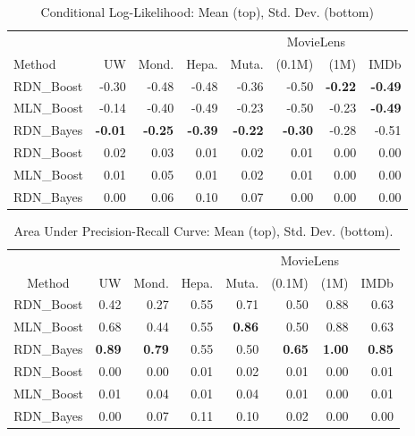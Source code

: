 \documentclass{sfuthesis}
\begin{document}
{\addtolength{\tabcolsep}{2pt}
\begin{table}[tb]
  \centering
  \caption{Conditional Log-Likelihood: Mean (top), Std. Dev. (bottom) }
    \begin{tabular}{l r r r r r r r}
    \hline
                 &          &              &                 &          & \multicolumn{2}{c}{MovieLens} & \\
                                                                                 \cline{6-7}
    Method & UW    & Mond. & Hepa. & Muta. & (0.1M) & (1M) & IMDb \\
    \hline
    RDN\_Boost & -0.30 & -0.48 & -0.48 & -0.36  & -0.50 & \textbf{-0.22} & \textbf{-0.49} \\
    MLN\_Boost & -0.14 & -0.40 & -0.49 & -0.23 & -0.50 & -0.23 & \textbf{-0.49} \\
    RDN\_Bayes & \textbf{-0.01} & \textbf{-0.25} & \textbf{-0.39} & \textbf{-0.22} & \textbf{-0.30} & -0.28 & -0.51 \\
    \hline
    RDN\_Boost & 0.02 & 0.03 & 0.01 & 0.02 & 0.01 & 0.00 & 0.00 \\
    MLN\_Boost & 0.01 & 0.05 & 0.01 & 0.02 & 0.01 & 0.00 & 0.00 \\
    RDN\_Bayes & 0.00 & 0.06 & 0.10 & 0.07 & 0.00 & 0.00 & 0.00 \\
    \hline
    \end{tabular}%
  \label{table:cll}%
\end{table}%
}
\begin{table}[tb]
  \addtolength{\tabcolsep}{2pt}
  \centering 
  \caption{Area Under Precision-Recall Curve: Mean (top), Std. Dev. (bottom).}
    \begin{tabular}{c r r r r r r r}    \hline
                 &          &            &          &           & \multicolumn{2}{c}{MovieLens} & \\
                                                                          \cline{6-7}     
    Method & UW    & Mond. & Hepa. & Muta. & (0.1M) & (1M)                            & IMDb\\
    \hline
    RDN\_Boost &0.42&0.27&0.55&0.71&0.50&0.88&0.63 \\
    MLN\_Boost &0.68&0.44&0.55& \textbf{0.86} &0.50&0.88&0.63 \\
    RDN\_Bayes & \textbf{0.89} & \textbf{0.79} &0.55&0.50& \textbf{0.65} &\textbf{1.00}& \textbf{0.85} \\
    \hline
    RDN\_Boost &0.00&0.00&0.01&0.02&0.01&0.00&0.01 \\
    MLN\_Boost &0.01&0.04&0.01&0.04&0.01&0.00&0.01 \\
    RDN\_Bayes &0.00&0.07&0.11&0.10&0.02&0.00&0.00 \\
    \hline
    \end{tabular}%
  \label{table:AUC}%
\end{table}%
%
\end{document}

